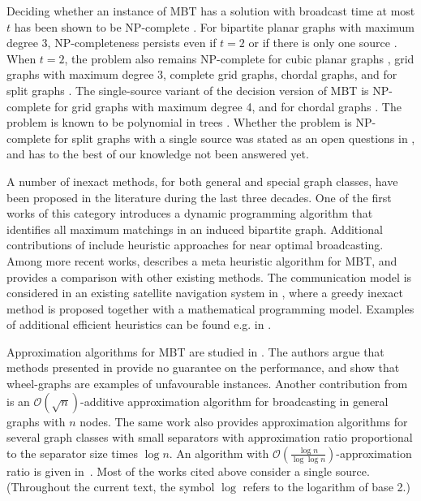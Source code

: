 Deciding whether an instance of MBT has a solution with broadcast time at most $t$ has been shown to be NP-complete \cite{slater81}. 
For bipartite planar graphs with maximum degree 3, NP-completeness persists even if $t=2$ or if there is only one source \cite{jansen95}.
When $t=2$, the problem also remains NP-complete for cubic planar graphs \cite{middendorf93}, grid graphs with maximum degree 3,
complete grid graphs, chordal graphs, and for split graphs \cite{jansen95}. 
The single-source variant of the decision version of MBT is NP-complete for grid graphs with maximum degree 4, and for chordal graphs \cite{jansen95}.
The problem is known to be polynomial in trees \cite{slater81}.
Whether the problem is NP-complete for split graphs with a single source was stated as an open questions in \cite{jansen95}, and has to the best of our knowledge not been answered yet.

A number of inexact methods, for both general and special graph classes, have been proposed in the literature during the last three decades.
One of the first works of this category \cite{scheuermann84} 
introduces a dynamic programming algorithm that identifies all maximum matchings in an induced bipartite graph.
Additional contributions of \cite{scheuermann84} include heuristic approaches for near optimal broadcasting.
Among more recent works, \cite{hasson04} describes a meta heuristic algorithm for MBT, and provides a comparison with other existing methods.
The communication model is considered in an existing satellite navigation system in \cite{chu17}, where a greedy inexact method is proposed together with a mathematical programming model.
Examples of additional efficient heuristics can be found e.g. in \cite{harutyunyan06,harutyunyan14,wang10}.

Approximation algorithms for MBT are studied in \cite{kortsarz95}. 
The authors argue that methods presented in \cite{scheuermann84} provide no guarantee on the performance, and show that wheel-graphs are examples of unfavourable instances.
Another contribution from \cite{kortsarz95} is an $\mathcal{O}(\sqrt{n})$-additive approximation algorithm for broadcasting in general graphs with $n$ nodes.
The same work also provides approximation algorithms for several graph classes with small separators with approximation ratio proportional to the separator size times $\log n$.
An algorithm with $\mathcal{O}\left(\frac{\log n}{\log \log n}\right)$-approximation ratio is given in~\cite{elkin03}.
Most of the works cited above consider a single source.
(Throughout the current text, the symbol $\log$ refers to the logarithm of base 2.)

